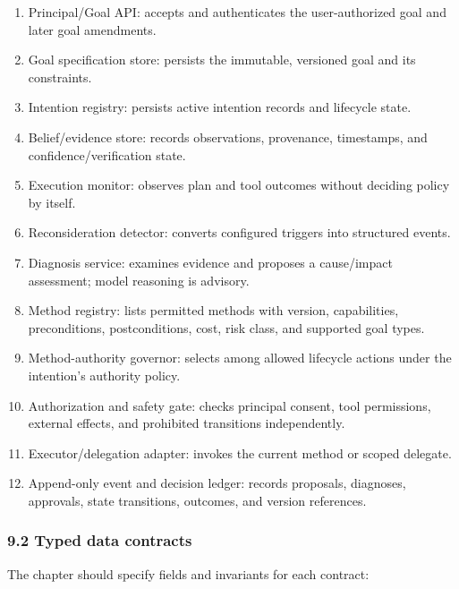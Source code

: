 \begin{enumerate}
\def\labelenumi{\arabic{enumi}.}
\tightlist
\item
  Principal/Goal API: accepts and authenticates the user-authorized goal and later goal amendments.
\item
  Goal specification store: persists the immutable, versioned goal and its constraints.
\item
  Intention registry: persists active intention records and lifecycle state.
\item
  Belief/evidence store: records observations, provenance, timestamps, and confidence/verification state.
\item
  Execution monitor: observes plan and tool outcomes without deciding policy by itself.
\item
  Reconsideration detector: converts configured triggers into structured events.
\item
  Diagnosis service: examines evidence and proposes a cause/impact assessment; model reasoning is advisory.
\item
  Method registry: lists permitted methods with version, capabilities, preconditions, postconditions, cost, risk class, and supported goal types.
\item
  Method-authority governor: selects among allowed lifecycle actions under the intention's authority policy.
\item
  Authorization and safety gate: checks principal consent, tool permissions, external effects, and prohibited transitions independently.
\item
  Executor/delegation adapter: invokes the current method or scoped delegate.
\item
  Append-only event and decision ledger: records proposals, diagnoses, approvals, state transitions, outcomes, and version references.
\end{enumerate}

\subsubsection{9.2 Typed data contracts}\label{typed-data-contracts}

The chapter should specify fields and invariants for each contract:

